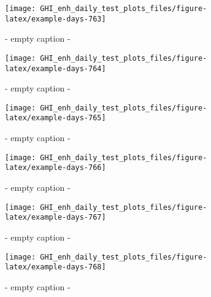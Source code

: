 \documentclass[
  10pt,
  a4paper,oneside]{article}
\begin{document}
\begin{figure}[H]

{\centering \texttt{[image: GHI\_enh\_daily\_test\_plots\_files/figure-latex/example-days-763]} 

}

\caption{ - empty caption - }\label{fig:example-days-763}
\end{figure}

\begin{figure}[H]

{\centering \texttt{[image: GHI\_enh\_daily\_test\_plots\_files/figure-latex/example-days-764]} 

}

\caption{ - empty caption - }\label{fig:example-days-764}
\end{figure}

\begin{figure}[H]

{\centering \texttt{[image: GHI\_enh\_daily\_test\_plots\_files/figure-latex/example-days-765]} 

}

\caption{ - empty caption - }\label{fig:example-days-765}
\end{figure}

\begin{figure}[H]

{\centering \texttt{[image: GHI\_enh\_daily\_test\_plots\_files/figure-latex/example-days-766]} 

}

\caption{ - empty caption - }\label{fig:example-days-766}
\end{figure}

\begin{figure}[H]

{\centering \texttt{[image: GHI\_enh\_daily\_test\_plots\_files/figure-latex/example-days-767]} 

}

\caption{ - empty caption - }\label{fig:example-days-767}
\end{figure}

\begin{figure}[H]

{\centering \texttt{[image: GHI\_enh\_daily\_test\_plots\_files/figure-latex/example-days-768]} 

}

\caption{ - empty caption - }\label{fig:example-days-768}
\end{figure}
\end{document}
